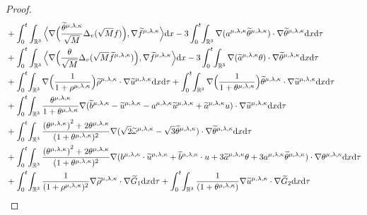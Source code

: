 \documentclass[reqno,11pt]{amsart}
\theoremstyle{plain}
\numberwithin{equation}{section}
\begin{document}
\begin{proof}
\begin{align}
&+\int_0^t  \int_{\mathbb{R}^3}\Big\langle\nabla\Big(\frac{\widetilde\theta^{\mu,\lambda,\kappa}}{\sqrt{M}}\Delta_v(\sqrt{M}f)\Big),\nabla\widetilde{f}^{\mu,\lambda,\kappa}\Big\rangle{\rm d}x-3\int_0^t\!\int_{\mathbb{R}^3}\nabla(a^{\mu,\lambda,\kappa}\widetilde\theta^{\mu,\lambda,\kappa})\cdot \nabla\widetilde\theta^{\mu,\lambda,\kappa}{\rm d}x{\rm d}
\tau\nonumber\\
&+\int_0^t \int_{\mathbb{R}^3}\Big\langle\nabla\Big(\frac{\theta}{\sqrt{M}}\Delta_v(\sqrt{M}\widetilde{f}^{\mu,\lambda,\kappa})\Big),\nabla\widetilde{f}^{\mu,\lambda,\kappa}\Big\rangle{\rm d}x-3\int_0^t\!\int_{\mathbb{R}^3}\nabla(\widetilde{a}^{\mu,\lambda,\kappa} \theta)\cdot\nabla\widetilde{\theta}^{\mu,\lambda,\kappa} {\rm d}x{\rm d}
\tau\nonumber\\
&+\int_0^t\!\int_{\mathbb{R}^3} \nabla\Big( \frac{1}{1+\rho^{\mu,\lambda,\kappa}}\Big)\widetilde{\rho}^{{\mu,\lambda,\kappa}}\cdot \nabla \widetilde{u}^{\mu,\lambda,\kappa}{\rm d}x{\rm d}
\tau +\int_0^t\!\int_{\mathbb{R}^3} \nabla\Big( \frac{1}{1+\theta^{\mu,\lambda,\kappa}}\Big)\widetilde{\theta}^{{\mu,\lambda,\kappa}}\cdot \nabla \widetilde{u}^{\mu,\lambda,\kappa}{\rm d}x{\rm d}
\tau\nonumber\\
&+ \int_0^t\!\int_{\mathbb{R}^3}   \frac{\theta^{\mu,\lambda,\kappa}}{1+\theta^{\mu,\lambda,\kappa}} \nabla(\widetilde{b}^{{\mu,\lambda,\kappa}}-\widetilde{u}^{\mu,\lambda,\kappa}-a^{\mu,\lambda,\kappa}\widetilde{u}^{\mu,\lambda,\kappa}+\widetilde{a}^{\mu,\lambda,\kappa}u)\cdot \nabla \widetilde{u}^{\mu,\lambda,\kappa}{\rm d}x{\rm d}
\tau \nonumber\\
&+ \int_0^t\!\int_{\mathbb{R}^3}   \frac{{(\theta^{\mu,\lambda,\kappa})}^2+2\theta^{\mu,\lambda,\kappa}}{(1+\theta^{\mu,\lambda,\kappa})^2} \nabla(\sqrt{2}\widetilde{\omega}^{{\mu,\lambda,\kappa}}-\sqrt{3}\widetilde{\theta}^{\mu,\lambda,\kappa})\cdot \nabla \widetilde{\theta}^{\mu,\lambda,\kappa}{\rm d}x{\rm d}
\tau \nonumber\\
&+ \int_0^t\!\int_{\mathbb{R}^3}   \frac{{(\theta^{\mu,\lambda,\kappa})}^2+2\theta^{\mu,\lambda,\kappa}}{(1+\theta^{\mu,\lambda,\kappa})^2}\nabla(b^{\mu,\lambda,\kappa}\cdot\widetilde{u}^{\mu,\lambda,\kappa}+\widetilde{b}^{\mu,\lambda,\kappa}\cdot u+3\widetilde{a}^{\mu,\lambda,\kappa}\theta+3a^{\mu,\lambda,\kappa}\widetilde{\theta}^{\mu,\lambda,\kappa})\cdot\nabla\theta^{\mu,\lambda,\kappa}  {\rm d}x{\rm d}
\tau \nonumber\\
&+\int_0^t\!\int_{\mathbb{R}^3}\frac{1}{(1+\rho^{\mu,\lambda,\kappa})^2} \nabla\widetilde{\rho}^{{\mu,\lambda,\kappa}}\cdot\nabla\widetilde{G}_1 {\rm d}x{\rm d}\tau+\int_0^t\!\int_{\mathbb{R}^3}\frac{1}{(1+\theta^{\mu,\lambda,\kappa}) }  \nabla\widetilde{u}^{{\mu,\lambda,\kappa}}\cdot\nabla\widetilde{G}_2 {\rm d}x{\rm d}\tau\nonumber\\

\end{align}
\end{proof}
\end{document}
